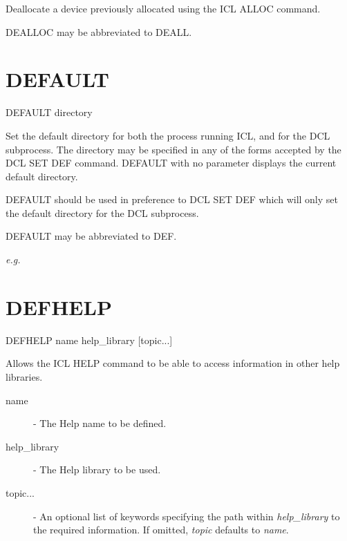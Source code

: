 \documentclass[twoside,11pt,nolof,chapters]{starlink}
\begin{document}
 Deallocate a device previously allocated using the ICL ALLOC command.

 DEALLOC may be abbreviated to DEALL.

\section{DEFAULT\label{DEFAULT}}

   DEFAULT \hspace{.5cm} directory

 Set the default directory for both the process running ICL, and for the
 DCL subprocess. The directory may be specified in any of the forms
 accepted by the DCL  SET DEF command. DEFAULT with no parameter
 displays the current default directory.

 DEFAULT should be used in preference to DCL SET DEF which will only
 set the default directory for the DCL subprocess.

 DEFAULT may be abbreviated to DEF.

\emph{e.g.}

\section{DEFHELP\label{DEFHELP}}

   DEFHELP \hspace{.5cm} name \hspace{.5cm} help\_library \hspace{.5cm}
[topic...]

 Allows the ICL HELP command to be able to access information in other
 help libraries.

\begin{description}

 \item[name] - The Help name to be defined.

 \item[help\_library] - The Help library to be used.

 \item[topic...] - An optional list of keywords specifying the path within
\emph{help\_library} to the required information. If omitted, \emph{topic}
defaults to \emph{name}.

\end{description}
\end{document}
